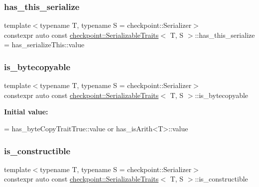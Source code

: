 \subsubsection{\texorpdfstring{has\+\_\+this\+\_\+serialize}{has\_this\_serialize}}
{\footnotesize\ttfamily template$<$typename T, typename S = checkpoint\+::\+Serializer$>$ \\
constexpr auto const \hyperlink{structcheckpoint_1_1_serializable_traits}{checkpoint\+::\+Serializable\+Traits}$<$ T, S $>$\+::has\+\_\+this\+\_\+serialize = has\+\_\+serialize\+This\+::value\hspace{0.3cm}{\ttfamily [static]}}

\mbox{\label{structcheckpoint_1_1_serializable_traits_a19e58ea0f510be10502e476258ed14ae}} 
\subsubsection{\texorpdfstring{is\+\_\+bytecopyable}{is\_bytecopyable}}
{\footnotesize\ttfamily template$<$typename T, typename S = checkpoint\+::\+Serializer$>$ \\
constexpr auto const \hyperlink{structcheckpoint_1_1_serializable_traits}{checkpoint\+::\+Serializable\+Traits}$<$ T, S $>$\+::is\+\_\+bytecopyable\hspace{0.3cm}{\ttfamily [static]}}

{\bfseries Initial value\+:}
\begin{DoxyCode}
=
    has\_byteCopyTraitTrue::value or has\_isArith<T>::value
\end{DoxyCode}
\mbox{\label{structcheckpoint_1_1_serializable_traits_a7720e2f57d1b3d2f87fd022b47d0b775}} 
\subsubsection{\texorpdfstring{is\+\_\+constructible}{is\_constructible}}
{\footnotesize\ttfamily template$<$typename T, typename S = checkpoint\+::\+Serializer$>$ \\
constexpr auto const \hyperlink{structcheckpoint_1_1_serializable_traits}{checkpoint\+::\+Serializable\+Traits}$<$ T, S $>$\+::is\+\_\+constructible\hspace{0.3cm}{\ttfamily [static]}}

